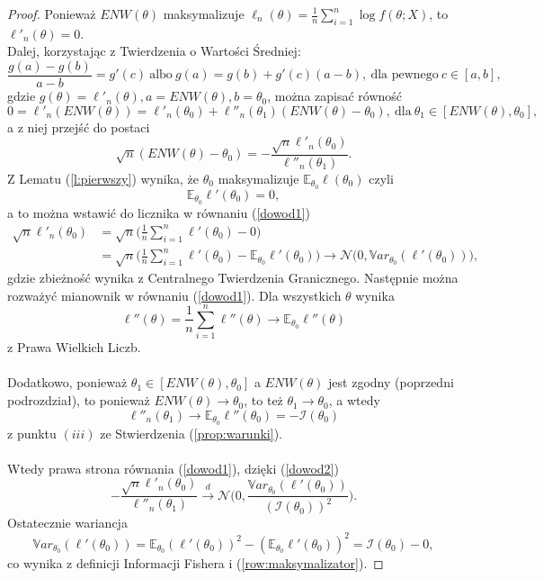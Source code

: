 \begin{proof}
Ponieważ $ENW(\theta)$ maksymalizuje $\ell_n(\theta) = \frac{1}{n}\sum\limits_{i=1}^{n}\log f(\theta;X)$, to $\ell'_n(\theta)=0$. \\ Dalej, korzystając z Twierdzenia o Wartości Średniej:
$$\dfrac{g(a)-g(b)}{a-b} = g'(c) \ \text{albo} \ g(a)=g(b)+g'(c)(a-b), \ \text{dla pewnego} \ c \in [a,b],$$
gdzie $g(\theta) = \ell'_n(\theta), a = ENW(\theta), b = \theta_0$, można zapisać równość
$$ 0 = \ell'_n(ENW(\theta)) = \ell'_n(\theta_0) + \ell''_n(\theta_1)(ENW(\theta)-\theta_0), \ \text{dla} \ \theta_1 \in [ENW(\theta),\theta_0],$$ 
a z niej przejść do postaci 
\begin{equation}\label{dowod1}
\sqrt{n}(ENW(\theta)-\theta_0) = - \dfrac{\sqrt{n}\ell'_n(\theta_0)}{\ell''_n(\theta_1)}.
\end{equation}
Z Lematu (\ref{l:pierwszy}) wynika, że $\theta_0$ maksymalizuje $\mathbb{E}_{\theta_0}\ell(\theta_0)$ czyli
\begin{equation}\label{row:maksymalizator}
\mathbb{E}_{\theta_0}\ell'(\theta_0) = 0,
\end{equation}
a to można wstawić do licznika w równaniu (\ref{dowod1})
\begin{equation}\label{dowod2}
\begin{split}
\sqrt{n}\ell'_n(\theta_0) & = \sqrt{n}\Big(\frac{1}{n}\sum\limits_{i=1}^{n}\ell'(\theta_0) - 0\Big) \\
& = \sqrt{n}\Big(\frac{1}{n}\sum\limits_{i=1}^{n}\ell'(\theta_0) - \mathbb{E}_{\theta_0}\ell'(\theta_0)\Big) \rightarrow \mathcal{N}\Big(0, \mathbb{V}ar_{\theta_0}(\ell'(\theta_0))\Big),
\end{split}
\end{equation}
gdzie zbieżność wynika z Centralnego Twierdzenia Granicznego. 
\newpage
Następnie można rozważyć mianownik w równaniu (\ref{dowod1}). Dla wszystkich $\theta$ wynika
$$\ell''(\theta) = \frac{1}{n}\sum\limits_{i=1}^{n}\ell''(\theta) \rightarrow \mathbb{E}_{\theta_0}\ell''(\theta)$$
z Prawa Wielkich Liczb. \\ \ \\ Dodatkowo, ponieważ $\theta_1 \in [ENW(\theta),\theta_0]$ a $ENW(\theta)$ jest zgodny (poprzedni podrozdział), to ponieważ $ENW(\theta) \rightarrow \theta_0$, to też $\theta_1 \rightarrow \theta_0$, a wtedy
$$\ell''_n(\theta_1) \rightarrow \mathbb{E}_{\theta_0}\ell''(\theta_0) = -\mathcal{I}(\theta_0)$$
z punktu $(iii)$ ze Stwierdzenia (\ref{prop:warunki}).\\ \ \\ Wtedy prawa strona równania (\ref{dowod1}), dzięki (\ref{dowod2})
$$- \dfrac{\sqrt{n}\ell'_n(\theta_0)}{\ell''_n(\theta_1)} \overset{d}{\rightarrow} \mathcal{N}\Big(0,\dfrac{\mathbb{V}ar_{\theta_0}(\ell'(\theta_0))}{(\mathcal{I}(\theta_0))^2} \Big).$$
Ostatecznie wariancja
$$\mathbb{V}ar_{\theta_0}(\ell'(\theta_0)) = \mathbb{E}_{\theta_0}(\ell'(\theta_0))^2 - (\mathbb{E}_{\theta_0}\ell'(\theta_0))^2 = \mathcal{I}(\theta_0) - 0,$$
co wynika z definicji Informacji Fishera i (\ref{row:maksymalizator}).

\end{proof}